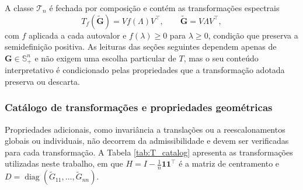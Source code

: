 A classe $\mathcal{T}_n$ é fechada por composição e contém as transformações espectrais
\begin{equation}\label{eq:spectral_transformation}
    T_f(\widetilde{\mathbf{G}}) = V f(\Lambda)V^\top, \qquad \widetilde{\mathbf{G}} = V\Lambda V^\top,
\end{equation}
com $f$ aplicada a cada autovalor e $f(\lambda)\geq 0$ para $\lambda\geq 0$, condição que preserva a semidefinição positiva. As leituras das seções seguintes dependem apenas de $\mathbf{G}\in\mathbb{S}_+^n$ e não exigem uma escolha particular de $T$, mas o seu conteúdo interpretativo é condicionado pelas propriedades que a transformação adotada preserva ou descarta.

\subsubsection*{Catálogo de transformações e propriedades geométricas}

Propriedades adicionais, como invariância a translações ou a reescalonamentos globais ou individuais, não decorrem da admissibilidade e devem ser verificadas para cada transformação. A Tabela \ref{tab:T_catalog} apresenta as transformações utilizadas neste trabalho, em que $H = I - \frac{1}{n}\mathbf{1}\mathbf{1}^{\top}$ é a matriz de centramento e $D = \operatorname{diag}(\widetilde{G}_{11},\dots,\widetilde{G}_{nn})$.

